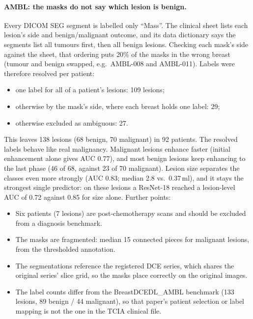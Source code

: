 \documentclass[11pt]{article}
\begin{document}
\paragraph{AMBL: the masks do not say which lesion is benign.} Every DICOM
SEG segment is labelled only ``Mass''. The clinical sheet lists each lesion's
side and benign/malignant outcome, and its data dictionary says the segments
list all tumours first, then all benign lesions. Checking each mask's side
against the sheet, that ordering puts 20\% of the masks in the wrong breast
(tumour and benign swapped, e.g.\ AMBL-008 and AMBL-011). Labels were
therefore resolved per patient:
\begin{itemize}
  \item one label for all of a patient's lesions: 109 lesions;
  \item otherwise by the mask's side, where each breast holds one label: 29;
  \item otherwise excluded as ambiguous: 27.
\end{itemize}
This leaves 138 lesions (68 benign, 70 malignant) in 92 patients. The
resolved labels behave like real malignancy. Malignant lesions enhance faster
(initial enhancement alone gives AUC 0.77), and most benign lesions keep
enhancing to the last phase (46 of 68, against 23 of 70 malignant). Lesion
size separates the classes even more strongly (AUC 0.83; median 2.8 vs.\
0.37\,ml), and it stays the strongest single predictor: on these lesions a
ResNet-18 reached a lesion-level AUC of 0.72 against 0.85 for size alone.
Further points:
\begin{itemize}
  \item Six patients (7 lesions) are post-chemotherapy scans and should be
  excluded from a diagnosis benchmark.
  \item The masks are fragmented: median 15 connected pieces for malignant
  lesions, from the thresholded annotation.
  \item The segmentations reference the registered DCE series, which shares
  the original series' slice grid, so the masks place correctly on the
  original images.
  \item The label counts differ from the BreastDCEDL\_AMBL benchmark (133
  lesions, 89 benign / 44 malignant), so that paper's patient selection or
  label mapping is not the one in the TCIA clinical file.
\end{itemize}
\end{document}
